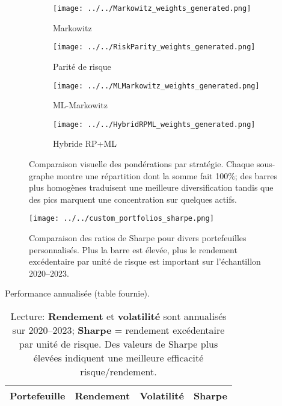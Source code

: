 \documentclass[11pt,a4paper]{article}
\begin{document}
\begin{figure}[h]
  \centering
  \begin{subfigure}[b]{0.48\textwidth}
    \centering
    \texttt{[image: ../../Markowitz\_weights\_generated.png]}
    \caption{Markowitz}
  \end{subfigure}
  \hfill
  \begin{subfigure}[b]{0.48\textwidth}
    \centering
    \texttt{[image: ../../RiskParity\_weights\_generated.png]}
    \caption{Parité de risque}
  \end{subfigure}
  
  \vspace{0.5em}
  \begin{subfigure}[b]{0.48\textwidth}
    \centering
    \texttt{[image: ../../MLMarkowitz\_weights\_generated.png]}
    \caption{ML-Markowitz}
  \end{subfigure}
  \hfill
  \begin{subfigure}[b]{0.48\textwidth}
    \centering
    \texttt{[image: ../../HybridRPML\_weights\_generated.png]}
    \caption{Hybride RP+ML}
  \end{subfigure}
  \caption{Comparaison visuelle des pondérations par stratégie. Chaque sous-graphe montre une répartition dont la somme fait 100\%; des barres plus homogènes traduisent une meilleure diversification tandis que des pics marquent une concentration sur quelques actifs.}
  \label{fig:weights_external}
\end{figure}

\begin{figure}[h]
  \centering
  \texttt{[image: ../../custom\_portfolios\_sharpe.png]}
  \caption{Comparaison des ratios de Sharpe pour divers portefeuilles personnalisés. Plus la barre est élevée, plus le rendement excédentaire par unité de risque est important sur l'échantillon 2020--2023.}
  \label{fig:custom_sharpe_external}
\end{figure}

\begin{table}[h]
  \centering
  \caption{Performance annualisée (table fournie).}
  \label{tab:summary_external}
  \begin{tabular}{lccc}
    \hline
    Portefeuille & Rendement & Volatilité & Sharpe \\
    \hline
    
  \end{tabular}
  \caption*{\footnotesize Lecture: \textbf{Rendement} et \textbf{volatilité} sont annualisés sur 2020--2023; \textbf{Sharpe} = rendement excédentaire par unité de risque. Des valeurs de Sharpe plus élevées indiquent une meilleure efficacité risque/rendement.}
\end{table}
\end{document}
